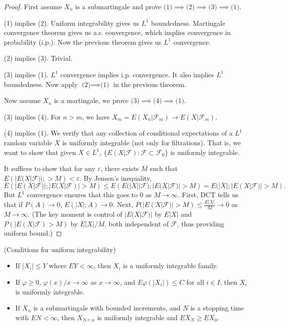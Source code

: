 \begin{proof}
	First assume $X_n$ is a submartingale and prove $\text{(1)} \implies \text{(2)} \implies \text{(3)} \implies \text{(1)}$.

	(1) implies (2). Uniform integrability gives us $L^1 $ boundedness. Martingale convergence theorem gives us a.s. convergence, which implies convergence in probability (i.p.). Now the previous theorem gives us $L^1$ convergence.

	(2) implies (3). Trivial.

	(3) implies (1). $L^1$ convergence implies i.p. convergence.  It also implies $L^1$ boundedness. Now apply $\text{(2)}\implies\text{(1)}$ in the previous theorem.

	Now assume $X_n$ is a martingale, we prove $\text{(3)}\implies \text{(4)} \implies \text{(1)}$.

	(3) implies (4). For $n > m$, we have $X_m = E\left( X_n | \mathcal{F}_m \right)  \to  E\left( X | \mathcal{F}_m \right) $.

	(4) implies (1). We verify that any collection of conditional expectations of a $L^1$ random variable $X$ is uniformly integrable (not only for filtrations). That is, we want to show that given $X \in L^1$, $\{E(X | \mathcal{F}): \mathcal{F} \subset \mathcal{F}_0\} $ is uniformly integrable.

	It suffices to show that for any $\varepsilon$, there exists $M$ such that $E\left(|E(X | \mathcal{F})| ; > M\right) < \varepsilon$. By Jensen's inequality,
	\[
		E\left( |E(X|\mathcal{F})|;|E(X|\mathcal{F})|>M \right) 
		\le E\left( E(|X| |\mathcal{F}); |E(X|\mathcal{F})|>M \right) 
		= E(|X| ; |E(X|\mathcal{F})|> M)
	.\] 
	But $L^1$ convergence ensures that this goes to $0$ as $M \to  \infty $. First, DCT tells us that if $P(A) \to  0$, $E(|X|; A) \to 0$. Next, $P(|E(X | \mathcal{F})| > M) \le \frac{E|X|}{M} \to 0$ as $M \to  \infty $. 
	(The key moment is control of $|E(X|\mathcal{F})|$ by $E|X|$ and $P(|E(X|\mathcal{F})>M)$ by $E|X|/M$, both independent of $\mathcal{F}$, thus providing uniform bound.)
\end{proof}



\begin{proposition}
	(Conditions for uniform integrability)
	\label{prop:UICond}
	\begin{itemize}
		\item If $|X_i| \le  Y$ where $E Y < \infty $, then $X_i$ is a uniformly integrable family.
		\item If $\varphi\ge 0$,  $\varphi(x) / x \to  \infty $ as $x \to  \infty $, and $E \varphi(|X_i|) \le  C$ for all $i \in I$, then $X_i$ is uniformly integrable.
		\item If $X_n$ is a submartingale with bounded increments, and $N$ is a stopping time with $EN < \infty $, then $X_{N \wedge n}$ is uniformly integrable and $E X_N \ge  E X_0$.
	\end{itemize}
\end{proposition}

